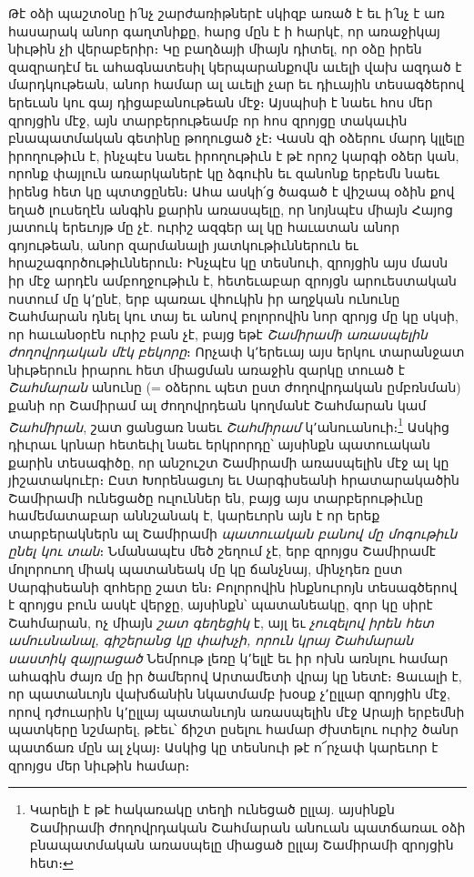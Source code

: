 \documentclass{article}
\begin{document}
{Թէ օձի պաշտօնը ի՛նչ շարժառիթներէ սկիզբ առած է եւ ի՛նչ է առ հասարակ անոր գաղտնիքը, հարց մըն է ի հարկէ, որ առաջիկայ նիւթին չի վերաբերիր։ Կը բաղձայի միայն դիտել, որ օձը իրեն զազրադէմ եւ ահագնատեսիլ կերպարանքովն աւելի վախ ազդած է մարդկութեան, անոր համար ալ աւելի չար եւ դիւային տեսագծերով երեւան կու գայ դիցաբանութեան մէջ։ Այսպիսի է նաեւ հոս մեր զրոյցին մէջ, այն տարբերութեամբ որ հոս զրոյցը տակաւին բնապատմական գետինը թողուցած չէ։ Վասն զի օձերու մարդ կլլելը իրողութիւն է, ինչպէս նաեւ իրողութիւն է թէ որոշ կարգի օձեր կան, որոնք փայլուն առարկաներէ կը ձգուին եւ զանոնք երբեմն նաեւ իրենց հետ կը պտտցընեն։ Ահա ասկի՛ց ծագած է վիշապ օձին քով եղած լուսեղէն անգին քարին առասպելը, որ նոյնպէս միայն Հայոց յատուկ երեւոյթ մը չէ. ուրիշ ազգեր ալ կը հաւատան անոր գոյութեան, անոր զարմանալի յատկութիւններուն եւ հրաշագործութիւններուն։ Ինչպէս կը տեսնուի, զրոյցին այս մասն իր մէջ արդէն ամբողջութիւն է, հետեւաբար զրոյցն արուեստական ոստում մը կ՚ընէ, երբ պառաւ վհուկին իր աղջկան ունունը Շահմարան դնել կու տայ եւ անով բոլորովին նոր զրոյց մը կը սկսի, որ հաւանօրէն ուրիշ բան չէ, բայց եթէ \emph{Շամիրամի առասպելին ժողովրդական մէկ բեկորը}։ Որչափ կ՚երեւայ այս երկու տարանջատ նիւթերուն իրարու հետ միացման առաջին զարկը տուած է \emph{Շահմարան} անունը (= օձերու պետ ըստ ժողովրդական ըմբռնման) քանի որ Շամիրամ ալ ժողովրդեան կողմանէ Շահմարան կամ \emph{Շահմիրան}, շատ ցանցառ նաեւ \emph{Շահմիրամ} կ՚անուանուի։\footnote{Կարելի է թէ հակառակը տեղի ունեցած ըլլայ. այսինքն Շամիրամի ժողովրդական Շահմարան անուան պատճառաւ օձի բնապատմական առասպելը միացած ըլլայ Շամիրամի զրոյցին հետ։} Ասկից դիւրաւ կրնար հետեւիլ նաեւ երկրորդը՝ այսինքն պատուական քարին տեսագիծը, որ անշուշտ Շամիրամի առասպելին մէջ ալ կը յիշատակուէր։ Ըստ Խորենացւոյ եւ Սարգիսեանի հրատարակածին Շամիրամի ունեցածը ուլուններ են, բայց այս տարբերութիւնը համեմատաբար աննշանակ է, կարեւորն այն է որ երեք տարբերակներն ալ Շամիրամի \emph{պատուական բանով մը մոգութիւն ընել կու տան}։ Նմանապէս մեծ շեղում չէ, երբ զրոյցս Շամիրամէ մոլորուող միակ պատանեակ մը կը ճանչնայ, մինչդեռ ըստ Սարգիսեանի զոհերը շատ են։ Բոլորովին ինքնուրոյն տեսագծերով է զրոյցս բուն ասկէ վերջը, այսինքն՝ պատանեակը, զոր կը սիրէ Շահմարան, ոչ միայն \emph{շատ գեղեցիկ} է, այլ եւ \emph{չուզելով իրեն հետ ամուսնանալ, գիշերանց կը փախչի, որուն կրայ Շահմարան սաստիկ զայրացած} Նեմրութ լեռը կ՚ելլէ եւ իր ոխն առնլու համար ահագին ժայռ մը իր ծամերով Արտամետի վրայ կը նետէ։ Ցաւալի է, որ պատանւոյն վախճանին նկատմամբ խօսք չ՚ըլլար զրոյցին մէջ, որով դժուարին կ՚ըլլայ պատանւոյն առասպելին մէջ Արայի երբեմնի պատկերը նշմարել, թէեւ՝ ճիշտ ըսելու համար ժխտելու ուրիշ ծանր պատճառ մըն ալ չկայ։ Ասկից կը տեսնուի թէ ո՜րչափ կարեւոր է զրոյցս մեր նիւթին համար։

}
\end{document}
